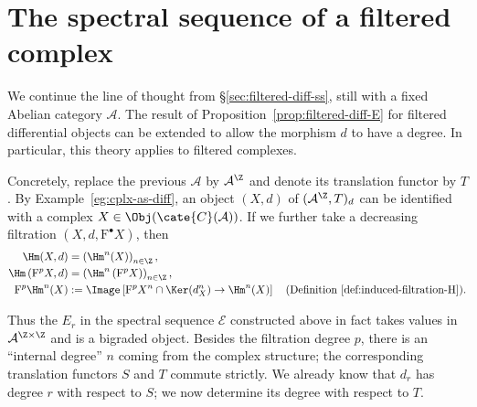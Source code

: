 
\section{The spectral sequence of a filtered complex}\label{sec:filtered-cplx-ss}
\hypertarget{o014.aljabr2.chapter5.filtered-complex-spectral-sequence}{ }

We continue the line of thought from \S\ref{sec:filtered-diff-ss}, still with
a fixed Abelian category $\mathcal{A}$. The result of
Proposition~\ref{prop:filtered-diff-E} for filtered differential objects can
be extended to allow the morphism $d$ to have a degree. In particular, this
theory applies to filtered complexes.

Concretely, replace the previous $\mathcal{A}$ by $\mathcal{A}^{\Z}$ and
denote its translation functor by $T$. By Example~\ref{eg:cplx-as-diff}, an
object $(X,d)$ of $(\mathcal{A}^{\Z},T)_d$ can be identified with a complex
$X\in\Obj(\cate{C}(\mathcal{A}))$. If we further take a decreasing filtration
$(X,d,\mathrm{F}^\bullet X)$, then
\begin{align*}
	\Hm(X,d)&=\left(\Hm^n(X)\right)_{n\in\Z}, \\
	\Hm\left(\mathrm{F}^pX,d\right)
	&=\left(\Hm^n\left(\mathrm{F}^pX\right)\right)_{n\in\Z}, \\
	\mathrm{F}^p\Hm^n(X)&:=
	\Image\left[\mathrm{F}^pX^n\cap\Ker(d_X^n)\to\Hm^n(X)\right]
	\quad\text{(Definition~\ref{def:induced-filtration-H}).}
\end{align*}

Thus the $E_r$ in the spectral sequence $\mathscr{E}$ constructed above in
fact takes values in $\mathcal{A}^{\Z\times\Z}$ and is a bigraded object.
Besides the filtration degree $p$, there is an ``internal degree'' $n$ coming
from the complex structure; the corresponding translation functors $S$ and
$T$ commute strictly. We already know that $d_r$ has degree $r$ with respect
to $S$; we now determine its degree with respect to $T$.

